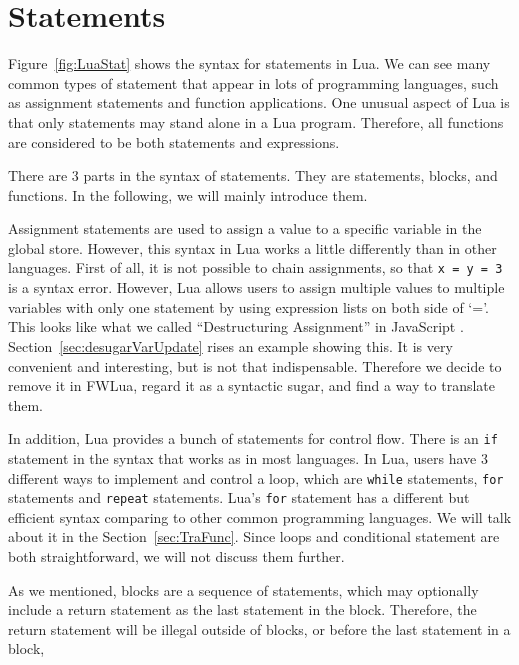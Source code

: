 \section{Statements}
Figure~\ref{fig:LuaStat} shows the syntax for statements in Lua. We can see many common types of statement that appear in lots of programming languages, such as assignment statements and function applications. One unusual aspect of Lua is that only statements may stand alone in a Lua program.
Therefore, all functions are considered to be both statements and expressions.

There are 3 parts in the syntax of statements. They are statements, blocks, and functions. In the following, we will mainly introduce them.

Assignment statements are used to assign a value to a specific variable in the global store.
However, this syntax in Lua works a little differently than in other languages.
First of all, it is not possible to chain assignments, so that {\tt x = y = 3} is a syntax error.
However, Lua allows users to assign multiple values to multiple variables with only one statement by using expression lists on both side of `='. 
This looks like what we called ``Destructuring Assignment'' in JavaScript \cite{DA}. 
Section~\ref{sec:desugarVarUpdate} rises an example showing this. It is very convenient and interesting, but is not that indispensable. Therefore we decide to remove it in FWLua, regard it as a syntactic sugar, and find a way to translate them.

In addition, Lua provides a bunch of statements for control flow. There is an {\tt if} statement in the syntax that works as in most languages. In Lua, users have 3 different ways to implement and control a loop, which are {\tt while} statements, {\tt for} statements and {\tt repeat} statements. Lua's {\tt for} statement has a different but efficient syntax comparing to other common programming languages. We will talk about it in the Section~\ref{sec:TraFunc}.
Since loops and conditional statement are both straightforward, we will not discuss them further.

As we mentioned, blocks are a sequence of statements, which may optionally include a return statement as the last statement in the block. Therefore, the return statement will be illegal outside of blocks, or before the last statement in a block,

\newcommand{\assign}[2]{{\overline{#1_i}}~{=}~{\overline{#2_j}}}
\newcommand{\doe}[1]{\mbox{\tt do}~#1~{\tt end}}
\newcommand{\ife}[3]{\mbox{\tt if}~{#1}~\mbox{\tt then}~{#2}~\mbox{\tt else}~{#3}~{\tt end}}
\newcommand{\whilee}[2]{\mbox{\tt while}~#1~{\tt do}~#2~{\tt end}}
\newcommand{\repeate}[2]{\mbox{\tt repeat}~#2~{\tt until}~#1~}
\newcommand{\for}[3]{\mbox{\tt for}~#1~=~#2_1,~#2_2,~#2_3~{\tt do}~#3~{\tt end}}
\newcommand{\function}[3]{\mbox{\tt function}~#1({\overline{#2_i}})~#3~{\tt end}}
\newcommand{\local}[2]{\mbox{\tt local}~{\assign #1 #2}}

